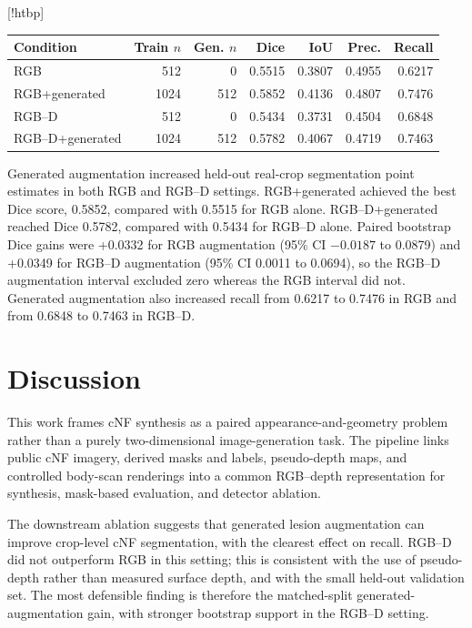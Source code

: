 \documentclass[runningheads]{llncs}
\makeatletter
\renewenvironment{table}
               {\setlength\abovecaptionskip{10\p@}%
                \setlength\belowcaptionskip{0\p@}%
                \@float{table}}
               {\end@float}
\makeatother
\begin{document}
\begin{table}[!htbp]
\centering
\small
\setlength{\tabcolsep}{4pt}
\begin{tabular}{lrrrrrr}
\toprule
Condition & Train $n$ & Gen. $n$ & Dice & IoU & Prec. & Recall \\
\midrule
RGB & 512 & 0 & 0.5515 & 0.3807 & 0.4955 & 0.6217 \\
RGB+generated & 1024 & 512 & 0.5852 & 0.4136 & 0.4807 & 0.7476 \\
RGB--D & 512 & 0 & 0.5434 & 0.3731 & 0.4504 & 0.6848 \\
RGB--D+generated & 1024 & 512 & 0.5782 & 0.4067 & 0.4719 & 0.7463 \\
\bottomrule
\end{tabular}
\caption{Held-out real validation metrics for the downstream crop-level cNF detector ablation.}
\label{tab:downstream}
\end{table}

Generated augmentation increased held-out real-crop segmentation point estimates in both RGB and RGB--D settings. RGB+generated achieved the best Dice score, 0.5852, compared with 0.5515 for RGB alone. RGB--D+generated reached Dice 0.5782, compared with 0.5434 for RGB--D alone. Paired bootstrap Dice gains were +0.0332 for RGB augmentation (95\% CI $-0.0187$ to 0.0879) and +0.0349 for RGB--D augmentation (95\% CI 0.0011 to 0.0694), so the RGB--D augmentation interval excluded zero whereas the RGB interval did not. Generated augmentation also increased recall from 0.6217 to 0.7476 in RGB and from 0.6848 to 0.7463 in RGB--D.

\section{Discussion}

This work frames cNF synthesis as a paired appearance-and-geometry problem rather than a purely two-dimensional image-generation task. The pipeline links public cNF imagery, derived masks and labels, pseudo-depth maps, and controlled body-scan renderings into a common RGB--depth representation for synthesis, mask-based evaluation, and detector ablation.

The downstream ablation suggests that generated lesion augmentation can improve crop-level cNF segmentation, with the clearest effect on recall. RGB--D did not outperform RGB in this setting; this is consistent with the use of pseudo-depth rather than measured surface depth, and with the small held-out validation set. The most defensible finding is therefore the matched-split generated-augmentation gain, with stronger bootstrap support in the RGB--D setting.
\end{document}
